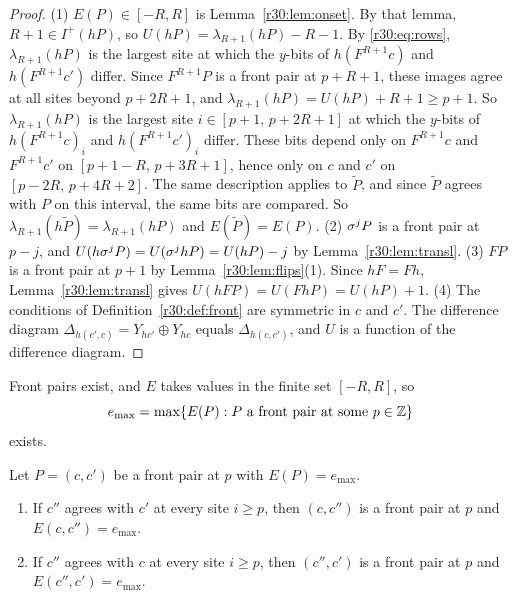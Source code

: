\begin{proof}
(1) $E(P)\in[-R,R]$ is Lemma~\ref{r30:lem:onset}. By that lemma, $R+1\in I^+(hP)$, so $U(hP)=\lambda_{R+1}(hP)-R-1$. By \eqref{r30:eq:rows}, $\lambda_{R+1}(hP)$ is the largest site at which the $y$-bits of $h(F^{R+1}c)$ and $h(F^{R+1}c')$ differ. Since $F^{R+1}P$ is a front pair at $p+R+1$, these images agree at all sites beyond $p+2R+1$, and $\lambda_{R+1}(hP)=U(hP)+R+1\ge p+1$. So $\lambda_{R+1}(hP)$ is the largest site $i\in[p+1,\,p+2R+1]$ at which the $y$-bits of $h(F^{R+1}c)_i$ and $h(F^{R+1}c')_i$ differ. These bits depend only on $F^{R+1}c$ and $F^{R+1}c'$ on $[p+1-R,\,p+3R+1]$, hence only on $c$ and $c'$ on $[p-2R,\,p+4R+2]$. The same description applies to $\tilde P$, and since $\tilde P$ agrees with $P$ on this interval, the same bits are compared. So $\lambda_{R+1}(h\tilde P)=\lambda_{R+1}(hP)$ and $E(\tilde P)=E(P)$.
(2) $\sigma^jP$ is a front pair at $p-j$, and $U(h\sigma^jP)=U(\sigma^jhP)=U(hP)-j$ by Lemma~\ref{r30:lem:transl}.
(3) $FP$ is a front pair at $p+1$ by Lemma~\ref{r30:lem:flips}(1). Since $hF=Fh$, Lemma~\ref{r30:lem:transl} gives $U(hFP)=U(FhP)=U(hP)+1$.
(4) The conditions of Definition~\ref{r30:def:front} are symmetric in $c$ and $c'$. The difference diagram $\Delta_{h(c',c)}=Y_{hc'}\oplus Y_{hc}$ equals $\Delta_{h(c,c')}$, and $U$ is a function of the difference diagram.
\end{proof}

Front pairs exist, and $E$ takes values in the finite set $[-R,R]$, so
\[
e_{\max}=\max\{E(P):P\text{ a front pair at some }p\in\mathbb{Z}\}
\]
exists.

\begin{lemma}\label{r30:lem:max}
Let $P=(c,c')$ be a front pair at $p$ with $E(P)=e_{\max}$.
\begin{enumerate}
\item If $c''$ agrees with $c'$ at every site $i\ge p$, then $(c,c'')$ is a front pair at $p$ and $E(c,c'')=e_{\max}$.
\item If $c''$ agrees with $c$ at every site $i\ge p$, then $(c'',c')$ is a front pair at $p$ and $E(c'',c')=e_{\max}$.
\end{enumerate}
\end{lemma}

